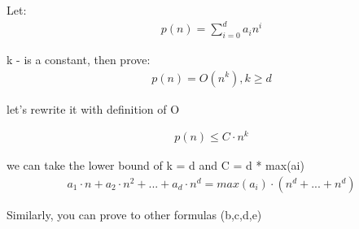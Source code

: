 \documentclass{article}
\begin{document}
    Let:
    \begin{align}
        p(n)= \sum_{i=0}^{d} a_i n^i
    \end{align}

    k - is a constant, then prove:
    \begin{align}
        p(n) = O(n^k), k \geq d
    \end{align}

    let's rewrite it with definition of O

    \begin{align}
        p(n) \leq C \cdot n^k
    \end{align}

    we can take the lower bound of k = d and C = d * max(ai)
    \begin{align}
        a_1 \cdot n + a_2 \cdot n^2 + ... + a_d \cdot n^d = max(a_i) \cdot (n^d  + ... + n^d)
    \end{align}

    Similarly, you can prove to other formulas (b,c,d,e)
\end{document}
